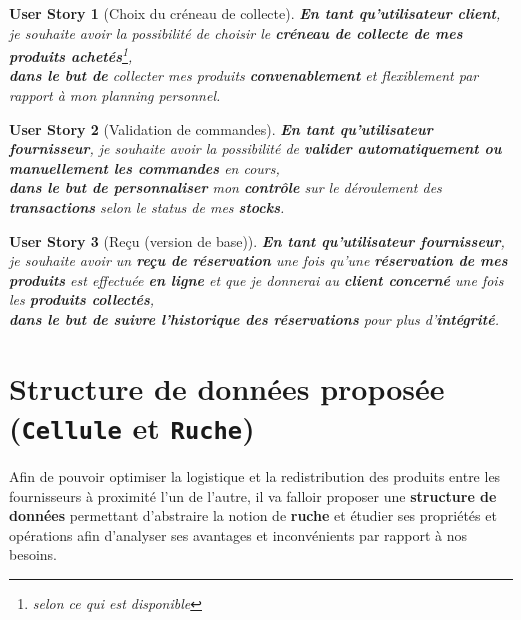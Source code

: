 \documentclass[a4paper,12pt]{book}
\theoremstyle{break}
\newtheorem*{userStory}{User Story}
\theoremstyle{break}
\theoremstyle{break}
\theoremstyle{break}
\theoremstyle{definition}
\theoremstyle{remark}
\begin{document}
\begin{userStory}[Choix du créneau de collecte]
\textbf{En tant qu'utilisateur {\color{green}client}}, je souhaite avoir la possibilité de choisir le \textbf{créneau de collecte de mes produits achetés}\footnote{selon ce qui est disponible},\\
\indent
\textbf{dans le but de} collecter mes produits \textbf{convenablement} et flexiblement par rapport à mon planning personnel.
\end{userStory}

\begin{userStory}[Validation de commandes]
\textbf{En tant qu'utilisateur {\color{red}fournisseur}}, je souhaite avoir la possibilité de \textbf{valider automatiquement ou manuellement les commandes} en cours,\\
\indent
\textbf{dans le but de personnaliser} mon \textbf{contrôle} sur le déroulement des \textbf{transactions} selon le status de mes \textbf{stocks}.
\end{userStory}

\begin{userStory}[Reçu (version de base)]
\textbf{En tant qu'utilisateur {\color{red}fournisseur}}, je souhaite avoir un \textbf{reçu de réservation} une fois qu'une \textbf{réservation de mes produits} est effectuée \textbf{en ligne} et que je donnerai au \textbf{{\color{green}client} concerné} une fois les \textbf{produits collectés},\\
\indent
\textbf{dans le but de suivre l'historique des réservations} pour plus d'\textbf{intégrité}.
\end{userStory}
\section{Structure de données proposée (\texttt{Cellule} et \texttt{Ruche})}
Afin de pouvoir optimiser la logistique et la redistribution des produits entre les fournisseurs à proximité l'un de l'autre, il va falloir proposer une \textbf{structure de données} permettant d'abstraire la notion de \textbf{ruche} et étudier ses propriétés et opérations afin d'analyser ses avantages et inconvénients par rapport à nos besoins.
\end{document}
